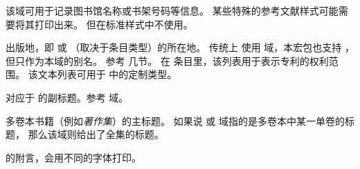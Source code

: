 \begin{fieldlist}

该域可用于记录图书馆名称或书架号码等信息。
某些特殊的参考文献样式可能需要将其打印出来。
但在标准样式中不使用。




出版地，即  或  （取决于条目类型）的所在地。
传统上 \BibTeX 使用  域，本宏包也支持 ，但只作为本域的别名。
参考  几节。
在  条目里，该列表用于表示专利的权利范围。
该文本列表可用于  中的定制类型。




对应于  的副标题。参考  域。




多卷本书籍（例如\emph{著作集}）的主标题。
如果说  或  域指的是多卷本中某一单卷的标题，
那么该域则给出了全集的标题。




 的附言，会用不同的字体打印。



\end{fieldlist}
